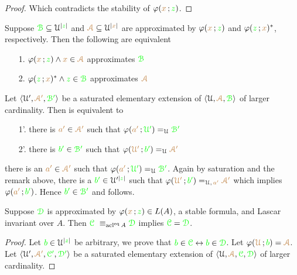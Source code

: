 \documentclass[creche.tex]{subfiles}
\begin{document}
{\begin{proof}
{


}

Which contradicts the stability of $\varphi({\color{brown} x}\,;{\color{green} z})$.
\end{proof}



\begin{remark}
Suppose ${\color{green}{\EuScript B}}\subseteq\EuScript U^{|{\color{green} z}|}$ and $\mrA\subseteq\U^{|{\mr x}|}$ are approximated by $\varphi({\color{brown} x}\,;{\color{green} z})$ and  $\varphi({\color{green} z}\,;{\color{brown} x})^*$, respectively. Then the following are equivalent
\begin{itemize}
\item[1.] $\phi({\mr x}\,;{\gr z})\wedge{\mr x}\in{\mrA}$ approximates ${\color{green}{\EuScript B}}$
\item[2.] $\varphi({\color{green} z}\,;{\color{brown} x})^*\wedge{\color{green}z}\in{{\color{green}{\EuScript B}}}$ approximates $\mrA$ 
\end{itemize}
\def\mrsA{{\mr\Aa'}}
\def\grsB{{\gr\B'}}
Let $\<\U',\mrsA,\grsB\>$ be a saturated  elementary extension of  $\<\U,\mrA,\grB\>$ of larger cardinality.  Then  is equivalent to

\begin{itemize}
\item[1'.] there is ${\mr a'}\in\mrsA$ such that $\phi({\mr a'}\,;{\gr\U'})=_{\U}\grsB$
\item[2'.]  there is ${\gr b'}\in\grsB$ such that $\phi({\mr\U'}\,;{\gr b'})=_{\U}\mrsA$
\end{itemize}

there is an ${\mr a'}\in\mrsA$ such that $\phi({\mr a'}\,;{\gr\U'})=_{\U}\grsB$. Again by saturation and the remark above, there is a ${\color{green} b'}\in\EuScript U'^{|{\color{green} z}|}$ such that $\phi({\mr\U'}\,;{\gr b'})=_{\U,\, {\mr a'}}\mrsA$ which implies $\varphi({\color{brown} a'}\,;{\color{green} b'})$. Hence ${\gr b'}\in\grsB$ and  follows.
\end{remark}

\begin{proposition}
Suppose ${\color{green}\EuScript D}$ is approximated by $\varphi({\color{brown} x}\,;{\color{green} z})\in L(A)$, a stable formula, and Lascar invariant over $A$.  Then ${\color{green}\EuScript C}\ \equiv_{\mathop{\rm acl}^{{\rm eq}} A}{\color{green}\EuScript D}$ implies ${\color{green}\EuScript C}={\color{green}\EuScript D}$. 
\end{proposition}

\begin{proof}
\def\grsC{{\gr\C'}}
\def\grsD{{\gr\D'}}
\def\mrA{{\mr\Aa}}
\def\mrsA{{\mr\Aa'}}
Let ${\color{green} b}\in\EuScript U^{|{\color{green} z}|}$ be arbitrary, we prove that ${\color{green} b}\in{\color{green}\EuScript C}\leftrightarrow{\color{green}b}\in{\color{green}\EuScript D}$. Let $\phi({\mr\U}\,;{\gr b})=\mrA$. Let $\<\U',\mrsA,\grsC,\grsD\>$ be a saturated elementary extension of $\<\U,\mrA, \grC,\grD\>$ of larger cardinality. 


\end{proof}}
\end{document}
